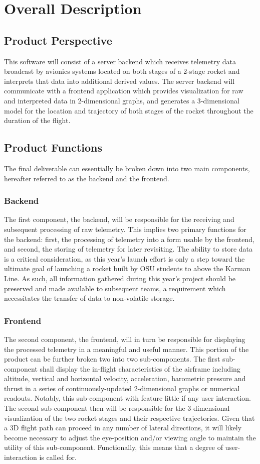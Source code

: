 \documentclass[onecolumn, draftclsnofoot,10pt, compsoc]{IEEEtran}
\begin{document}
	\newpage
	\section{Overall Description}
		\subsection{Product Perspective}
			This software will consist of a server backend which receives telemetry data broadcast by avionics systems located on both stages of a 2-stage rocket and interprets that data into additional derived values. 
			The server backend will communicate with a frontend application which provides visualization for raw and interpreted data in 2-dimensional graphs, and generates a 3-dimensional model for the location and trajectory of both stages of the rocket throughout the duration of the flight.

		\subsection{Product Functions}
			The final deliverable can essentially be broken down into two main components, hereafter referred to as the backend and the frontend.
			\subsubsection{Backend}
			The first component, the backend, will be responsible for the receiving and subsequent processing of raw telemetry.
			This implies two primary functions for the backend: first, the processing of telemetry into a form usable by the frontend, and second, the storing of telemetry for later revisiting.
			The ability to store data is a critical consideration, as this year's launch effort is only a step toward the ultimate goal of launching a rocket built by OSU students to above the Karman Line.
			As such, all information gathered during this year's project should be preserved and made available to subsequent teams, a requirement which necessitates the transfer of data to non-volatile storage.
			\subsubsection{Frontend}
			The second component, the frontend, will in turn be responsible for displaying the processed telemetry in a meaningful and useful manner.
			This portion of the product can be further broken two into two sub-components.
			The first sub-component shall display the in-flight characteristics of the airframe including altitude, vertical and horizontal velocity, acceleration, barometric pressure and thrust in a series of continuously-updated 2-dimensional graphs or numerical readouts. 
			Notably, this sub-component with feature little if any user interaction. 
			The second sub-component then will be responsible for the 3-dimensional visualization of the two rocket stages and their respective trajectories. 
			Given that a 3D flight path can proceed in any number of lateral directions, it will likely become necessary to adjust the eye-position and/or viewing angle to maintain the utility of this sub-component.
			Functionally, this means that a degree of user-interaction is called for.
			
\end{document}
